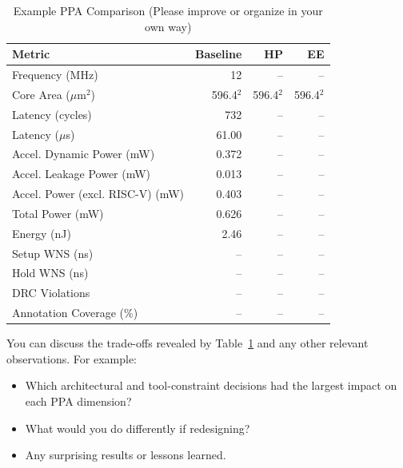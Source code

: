 \documentclass[conference]{IEEEtran}
\begin{document}
\begin{table}[htbp]
\caption{Example PPA Comparison (Please improve or organize in your own way)}
\label{tab:ppa}
\centering\footnotesize
\begin{tabular}{l r r r}
  \toprule
  \textbf{Metric} & \textbf{Baseline} & \textcolor{hpcolor}{\textbf{HP}} & \textcolor{eecolor}{\textbf{EE}} \\
  \midrule
  Frequency (MHz)            & 12              & {\color{hpcolor}--} & {\color{eecolor}--} \\
  Core Area ($\mu$m$^2$)     & 596.4$^2$       & 596.4$^2$ & 596.4$^2$ \\
  \midrule
  Latency (cycles)           & 732             & {\color{hpcolor}--} & {\color{eecolor}--} \\
  Latency ($\mu$s)           & 61.00           & {\color{hpcolor}--} & {\color{eecolor}--} \\
  \midrule
  Accel. Dynamic Power (mW)         & 0.372              & {\color{hpcolor}--} & {\color{eecolor}--} \\
  Accel. Leakage Power (mW)         & 0.013              & {\color{hpcolor}--} & {\color{eecolor}--} \\
  Accel. Power (excl. RISC-V) (mW)  & 0.403           & {\color{hpcolor}--} & {\color{eecolor}--} \\
  Total Power (mW)           & 0.626           & {\color{hpcolor}--} & {\color{eecolor}--} \\
  Energy (nJ)                & 2.46           & {\color{hpcolor}--} & {\color{eecolor}--} \\
  \midrule
  Setup WNS (ns)             & --              & {\color{hpcolor}--} & {\color{eecolor}--} \\
  Hold WNS (ns)              & --              & {\color{hpcolor}--} & {\color{eecolor}--} \\
  DRC Violations             & --              & {\color{hpcolor}--} & {\color{eecolor}--} \\
  Annotation Coverage (\%)   & --              & {\color{hpcolor}--} & {\color{eecolor}--} \\
  \bottomrule
\end{tabular}
\end{table}

You can discuss the trade-offs revealed by Table~\ref{tab:ppa} and any other relevant observations. For example:
\begin{itemize}
  \item Which architectural and tool-constraint decisions had the largest
        impact on each PPA dimension?
  \item What would you do differently if redesigning?
  \item Any surprising results or lessons learned.
\end{itemize}
\end{document}

